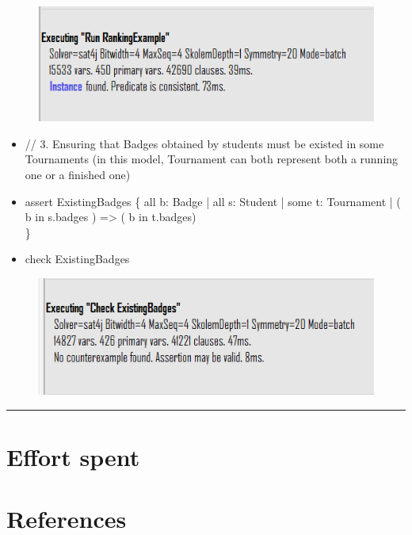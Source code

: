 \documentclass{Configuration_Files/Template}
\begin{document}
\begin{figure}[H]
\includegraphics[scale = 0.7]{Images/Alloy/2Outcome.png}\\
\centering
\end{figure}

\begin{itemize}
\item //  3. Ensuring that Badges obtained by students must be existed in some Tournaments (in this model, Tournament can both represent both a running one or a finished one)
\item assert ExistingBadges \{
    all b: Badge | all s: Student | some t: Tournament | ( b in s.badges ) => ( b in t.badges)\\
\}
\item check ExistingBadges
\end{itemize}
\begin{figure}[H]
\includegraphics[scale = 0.7]{Images/Alloy/3Outcome.png}\\
\centering
\end{figure}

{\color{bluepoli}\rule{\linewidth}{0.1pt}}

\chapter{Effort spent}

\chapter{References}
\end{document}

